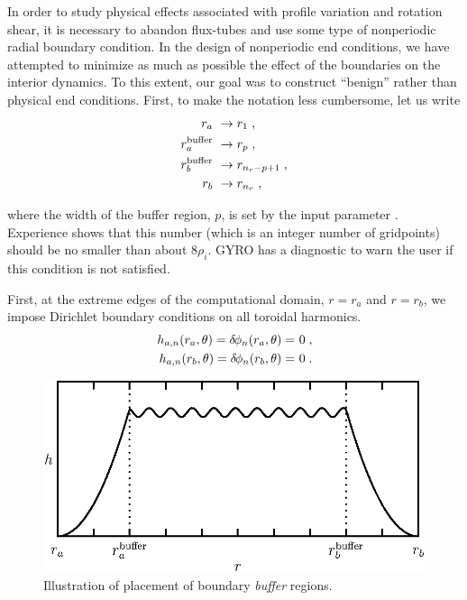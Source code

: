 In order to study physical effects associated with profile variation and 
rotation shear, it is necessary to abandon flux-tubes and use some type 
of nonperiodic radial boundary condition.  In the 
design of nonperiodic end conditions, we have attempted to 
minimize as much as possible the effect of the boundaries 
on the interior dynamics.  To this extent, our goal was 
to construct ``benign'' rather than physical end conditions.
First, to make the notation less cumbersome, let us write
%
\begin{align}
r_a &~\rightarrow r_1 \; , \\
r_a^{\rm buffer} &~\rightarrow r_p \; , \\
r_b^{\rm buffer} &~\rightarrow r_{n_r-p+1} \; , \\
r_b &~\rightarrow r_{n_r} \; , 
\end{align}

\noindent
where the width of the buffer region, $p$, is set by the input 
parameter .  Experience shows that this 
number (which is an integer number of gridpoints) should be no smaller 
than about $8\rho_i$.  GYRO has a diagnostic to warn the user if 
this condition is not satisfied.

First, at the extreme edges of the computational domain, $r=r_a$ 
and $r=r_b$, we impose Dirichlet boundary conditions on all 
toroidal harmonics.
%
\begin{align}
h_{a,n}(r_a,\theta) = \delta \hskip -1pt \phi_n(r_a,\theta) = &~0 \; , \\
h_{a,n}(r_b,\theta) = \delta \hskip -1pt \phi_n(r_b,\theta) = &~0 \; .
\end{align}

\begin{figure}
\begin{center}
\includegraphics[scale=1.0]{figures/boundary.eps}
\caption{Illustration of placement of boundary {\it buffer} regions.}
\label{fig.boundary}
\end{center}
\end{figure}

